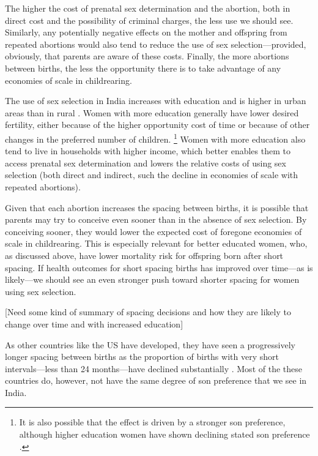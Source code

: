 The higher the cost of prenatal sex determination and the abortion, both in direct cost
and the possibility of criminal charges, the less use we should see.
Similarly, any potentially negative effects on the mother and offspring from repeated
abortions would also tend to reduce the use of sex selection---provided, obviously, that
parents are aware of these costs.
Finally, the more abortions between births, the less the opportunity there is to take
advantage of any economies of scale in childrearing.


The use of sex selection in India increases with education and is higher in urban
areas than in rural
\citep{das_gupta97,retherford03b,jha06,Guilmoto2009a,Bongaarts2013,Portner2015b,
Jayachandran2017}.
Women with more education generally have lower desired fertility, either because of the
higher opportunity cost of time or because of other changes in the preferred number of
children.%
\footnote{
It is also possible that the effect is driven by a stronger son preference, although 
higher education women have shown declining stated son preference \citep{bhat03,pande07}.
}
Women with more education also tend to live in households with higher income,
which better enables them to access prenatal sex determination and lowers the relative
costs of using sex selection (both direct and indirect, such the decline in 
economies of scale with repeated abortions).

Given that each abortion increases the spacing between births, it is possible that
parents may try to conceive even sooner than in the absence of sex selection.
By conceiving sooner, they would lower the expected cost of foregone economies of scale in 
childrearing.
This is especially relevant for better educated women, who, as discussed above, have
lower mortality risk for offspring born after short spacing.
If health outcomes for short spacing births has improved over time---as is likely---we
should see an even stronger push toward shorter spacing for women using sex selection.


[Need some kind of summary of spacing decisions and how they are likely to change
over time and with increased education]

As other countries like the US have developed, they have seen a progressively longer 
spacing between births as the proportion of births with very short intervals---less than 
24 months---have declined substantially \citep{Hotz1997}.
Most of the these countries do, however, not have the same degree of son preference that
we see in India.

